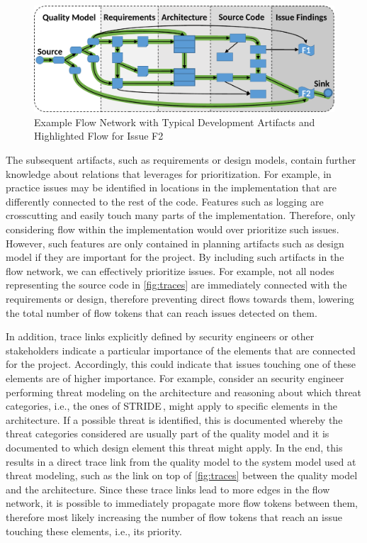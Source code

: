 \begin{figure}
	\centering
	\includegraphics[width=.7\columnwidth]{figures/traces04-KG}%
	\caption{Example Flow Network with Typical Development Artifacts and Highlighted Flow for Issue F2}%
	\label{fig:traces}
\end{figure}

     The subsequent artifacts, such as requirements or design models, contain further knowledge about relations that \appr{} leverages for prioritization.
	For example, in practice issues may be identified in locations in the implementation that are differently connected to the rest of the code.
	Features such as logging are crosscutting and easily touch many parts of the implementation.
	Therefore, only considering flow within the implementation would over prioritize such issues.
	However, such features are only contained in planning artifacts such as design model if they are important for the project.
	By including such artifacts in the flow network, we can effectively prioritize issues.
	For example, not all nodes representing the source code in \autoref{fig:traces} are immediately connected with the requirements or design, therefore preventing direct flows towards them, lowering the total number of flow tokens that can reach issues detected on them.

	 In addition, trace links explicitly defined by security engineers or other stakeholders indicate a particular importance of the elements that are connected for the project.
	Accordingly, this could indicate that issues touching one of these elements are of higher importance.
	For example, consider an security engineer performing threat modeling on the architecture and reasoning about which threat categories, i.e., the ones of STRIDE\,\cite{STRIDE,Shostack2008}, might apply to specific elements in the architecture.
	If a possible threat is identified, this is documented whereby the threat categories considered are usually part of the quality model and it is documented to which design element this threat might apply.
	In the end, this results in a direct trace link from the quality model to the system model used at threat modeling, such as the link on top of \autoref{fig:traces} between the quality model and the architecture.
	Since these trace links lead to more edges in the flow network, it is possible to immediately propagate more flow tokens between them, therefore most likely increasing the number of flow tokens that reach an issue touching these elements, i.e., its priority.

